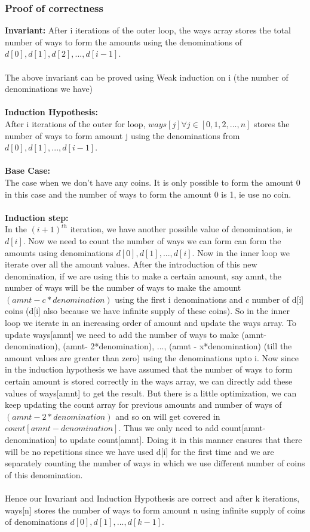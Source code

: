 \documentclass{article}
\begin{document}
\subsubsection{Proof of correctness}
\textbf{Invariant:} After i iterations of the outer loop, the ways array stores the total number of ways to form the amounts using the denominations of $d[0], d[1], d[2], ..., d[i-1]$.
\\\\
The above invariant can be proved using Weak induction on i (the number of denominations we have)
\\\\
\textbf{Induction Hypothesis:}\\
After i iterations of the outer for loop, ${ways[j] \forall j\in[0,1,2,\dots,n]}$ stores the number of ways to form amount j using the denominations from $d[0], d[1],  ..., d[i-1]$.
\\\\
\textbf{Base Case:}\\
The case when we don't have any coins. It is only possible to form the amount 0 in this case and the number of ways to form the amount 0  is 1, ie use no coin.
\\\\
\textbf{Induction step:}\\
In the $(i+1)^{th}$ iteration, we have another possible value of denomination, ie $d[i]$. Now we need to count the number of ways we can form can form the amounts using denominations $d[0], d[1], ..., d[i]$. Now in the inner loop we iterate over all the amount values. After the introduction of this new denomination, if we are using this to make a certain amount, say amnt, the number of ways will be the number of ways to make the amount $(amnt - c*denomination)$ using the first i denominations and $c$ number of d[i] coins (d[i] also because we have infinite supply of these coins). So in the inner loop we iterate in an increasing order of amount and update the ways array. To update ways[amnt] we need to add the number of ways to make (amnt- denomination), (amnt- 2*denomination),  ...,  (amnt - x*denomination) (till the amount values are greater than zero) using the denominations upto i. Now since in the induction hypothesis we have assumed that the number of ways to form certain amount is stored correctly in the ways array, we can directly add these values of ways[amnt] to get the result. But there is a little optimization, we can keep updating the count array for previous amounts and number of ways of $(amnt - 2*denomination)$ and so on will get covered in $count[amnt- denomination]$. Thus we only need to add count[amnt- denomination] to update count[amnt]. Doing it in this manner ensures that there will be no repetitions since we have used d[i] for the first time and we are separately counting the number of ways in which we use different number of coins of this denomination.
\\\\
Hence our Invariant and Induction Hypothesis are correct and after k iterations, ways[n] stores the number of ways to form amount n using infinite supply of coins of denominations $d[0], d[1], ..., d[k-1]$.
\end{document}
